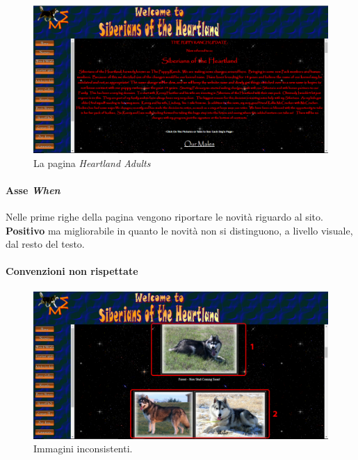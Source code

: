 \documentclass[../rapporto-usabilita.tex]{subfiles}
\begin{document}
	\begin{figure}[!h]
			\centering
				\includegraphics[scale=0.33]{immagini/adults.PNG}
					\caption{La pagina \textit{Heartland Adults}}
					\label{fig:adults}
		\end{figure}	
	
	\paragraph{Asse \textit{When}}
		Nelle prime righe della pagina vengono riportare le novità riguardo al sito. \textbf{Positivo} ma migliorabile in quanto le novità non si distinguono, a livello visuale, dal resto del testo.
	
	\paragraph{Convenzioni non rispettate}
	
		\begin{figure}[!h]
			\centering
				\includegraphics[scale=0.33]{immagini/part_adults1.jpg}
				\caption{Immagini inconsistenti.}
				\label{fig:adults1}
			\end{figure}	
	
\end{document}
